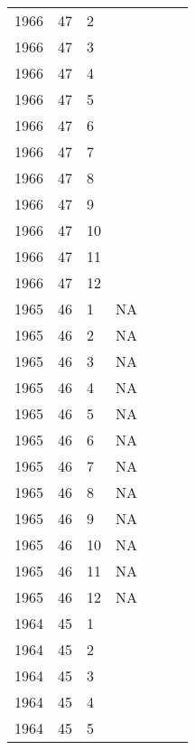 \begin{longtable}{ |l|l|l|l|p{2.7cm}|l|p{2cm}| }
 1966 & 47 &     2 &         &                &  & \\
 1966 & 47 &     3 &         &                &  & \\
 1966 & 47 &     4 &         &                &  & \\
 1966 & 47 &     5 &         &                &  & \\
 1966 & 47 &     6 &         &                &  & \\
 1966 & 47 &     7 &         &                &  & \\
 1966 & 47 &     8 &         &                &  & \\
 1966 & 47 &     9 &         &                &  & \\
 1966 & 47 &    10 &         &                &  & \\
 1966 & 47 &    11 &         &                &  & \\
 1966 & 47 &    12 &         &                &  & \\
 1965 & 46 &     1 &      NA &                &  & \\
 1965 & 46 &     2 &      NA &                &  & \\
 1965 & 46 &     3 &      NA &                &  & \\
 1965 & 46 &     4 &      NA &                &  & \\
 1965 & 46 &     5 &      NA &                &  & \\
 1965 & 46 &     6 &      NA &                &  & \\
 1965 & 46 &     7 &      NA &                &  & \\
 1965 & 46 &     8 &      NA &                &  & \\
 1965 & 46 &     9 &      NA &                &  & \\
 1965 & 46 &    10 &      NA &                &  & \\
 1965 & 46 &    11 &      NA &                &  & \\
 1965 & 46 &    12 &      NA &                &  & \\
 1964 & 45 &     1 &         &                &  & \\
 1964 & 45 &     2 &         &                &  & \\
 1964 & 45 &     3 &         &                &  & \\
 1964 & 45 &     4 &         &                &  & \\
 1964 & 45 &     5 &         &                &  & \\

\end{longtable}
